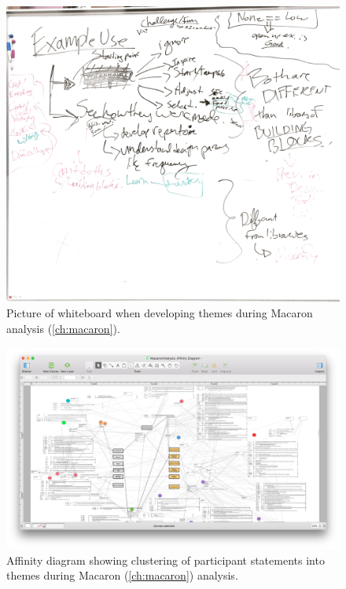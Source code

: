 	\begin{figure}[htbp] %
	   \centering
	   \includegraphics[width=\textwidth]{Chapter99-SupportingMaterials/MethodExamples/MacaronAnalysisWhiteboard} 
	   \caption{Picture of whiteboard when developing themes during Macaron analysis (\autoref{ch:macaron}).}
	   \label{fig:SupportingMaterials:MethodExamples:MacaronAnalysisWhiteboard}
	\end{figure}
	
	
	\begin{figure}[htbp] %
	   \centering
	   \includegraphics[width=\textwidth]{Chapter99-SupportingMaterials/MethodExamples/MacaronClustering} 
	   \caption{Affinity diagram showing clustering of participant statements into themes during Macaron (\autoref{ch:macaron}) analysis.}
	   \label{fig:SupportingMaterials:MethodExamples:MacaronClustering}
	\end{figure}

